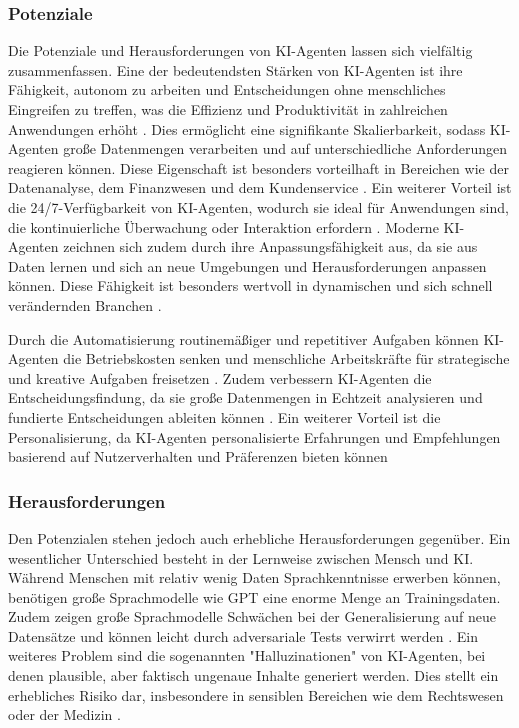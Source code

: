 \documentclass[conference]{IEEEtran}
\begin{document}
\subsubsection{Potenziale}
Die Potenziale und Herausforderungen von KI-Agenten lassen sich vielfältig zusammenfassen. Eine der bedeutendsten Stärken von KI-Agenten ist ihre Fähigkeit, autonom zu arbeiten und Entscheidungen ohne menschliches Eingreifen zu treffen, was die Effizienz und Produktivität in zahlreichen Anwendungen erhöht \cite{dagher_evolution_2023}.
Dies ermöglicht eine signifikante Skalierbarkeit, sodass KI-Agenten große Datenmengen verarbeiten und auf unterschiedliche Anforderungen reagieren können. Diese Eigenschaft ist besonders vorteilhaft in Bereichen wie der Datenanalyse, dem Finanzwesen und dem Kundenservice \cite{noauthor_was_nodate}.
Ein weiterer Vorteil ist die 24/7-Verfügbarkeit von KI-Agenten, wodurch sie ideal für Anwendungen sind, die kontinuierliche Überwachung oder Interaktion erfordern \cite{v-hanki_was_2023}.
Moderne KI-Agenten zeichnen sich zudem durch ihre Anpassungsfähigkeit aus, da sie aus Daten lernen und sich an neue Umgebungen und Herausforderungen anpassen können. Diese Fähigkeit ist besonders wertvoll in dynamischen und sich schnell verändernden Branchen \cite{dagher_evolution_2023}.

Durch die Automatisierung routinemäßiger und repetitiver Aufgaben können KI-Agenten die Betriebskosten senken und menschliche Arbeitskräfte für strategische und kreative Aufgaben freisetzen \cite{noauthor_was_nodate}.
Zudem verbessern KI-Agenten die Entscheidungsfindung, da sie große Datenmengen in Echtzeit analysieren und fundierte Entscheidungen ableiten können \cite{v-hanki_was_2023}.
Ein weiterer Vorteil ist die Personalisierung, da KI-Agenten personalisierte Erfahrungen und Empfehlungen basierend auf Nutzerverhalten und Präferenzen bieten können \cite{barua_exploring_2024}


\subsubsection{Herausforderungen}

Den Potenzialen stehen jedoch auch erhebliche Herausforderungen gegenüber. Ein wesentlicher Unterschied besteht in der Lernweise zwischen Mensch und KI. Während Menschen mit relativ wenig Daten Sprachkenntnisse erwerben können, benötigen große Sprachmodelle wie GPT eine enorme Menge an Trainingsdaten. Zudem zeigen große Sprachmodelle Schwächen bei der Generalisierung auf neue Datensätze und können leicht durch adversariale Tests verwirrt werden \cite{lappin_assessing_2024}.
Ein weiteres Problem sind die sogenannten "Halluzinationen" von KI-Agenten, bei denen plausible, aber faktisch ungenaue Inhalte generiert werden. Dies stellt ein erhebliches Risiko dar, insbesondere in sensiblen Bereichen wie dem Rechtswesen oder der Medizin \cite{lappin_assessing_2024}.
\end{document}
